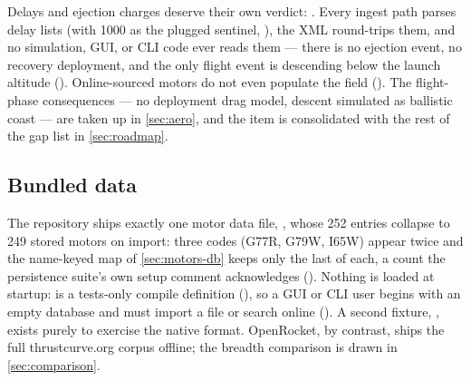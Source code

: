Delays and ejection charges deserve their own verdict: \fabsent. Every ingest path parses delay
lists (with 1000 as the plugged sentinel, ), the XML round-trips them,
and no simulation, GUI, or CLI code ever reads them --- there is no ejection event, no recovery
deployment, and the only flight event is descending below the launch altitude
(). Online-sourced motors do not even populate the field
(). The flight-phase consequences --- no deployment drag
model, descent simulated as ballistic coast --- are taken up in \cref{sec:aero}, and the item is
consolidated with the rest of the gap list in \cref{sec:roadmap}.

\subsection{Bundled data}\label{sec:motors-data}

The repository ships exactly one motor data file, , whose 252
 entries collapse to 249 stored motors on import: three codes (G77R, G79W, I65W)
appear twice and the name-keyed map of \cref{sec:motors-db} keeps only the last of each, a count
the persistence suite's own setup comment acknowledges
(). Nothing is loaded at startup:
 is a tests-only compile definition (),
so a GUI or CLI user begins with an empty database and must import a file or search online
(). A second fixture,
, exists purely to exercise the native format. OpenRocket,
by contrast, ships the full thrustcurve.org corpus offline; the breadth comparison is drawn in
\cref{sec:comparison}.
